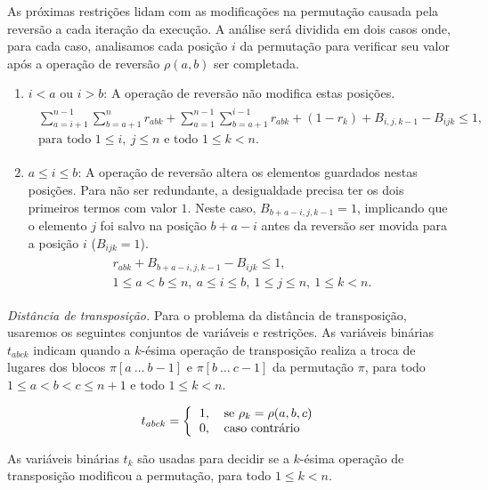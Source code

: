 As próximas restrições lidam com as modificações na permutação causada
pela reversão a cada iteração da execução. A análise será dividida em
dois casos onde, para cada caso, analisamos cada posição $i$ da
permutação para verificar seu valor após a operação de reversão
$\rho(a,b)$ ser completada.
\begin{enumerate}
\item{$i < a$ ou $i > b$:
A operação de reversão não modifica estas posições.
\begin{align}
  \begin{split}
    \sum_{a=i+1}^{n-1}\sum_{b=a+1}^{n} r_{abk} +
    \sum_{a=1}^{n-1}\sum_{b=a+1}^{i-1} r_{abk} +
    (1 - r_{k}) + B_{i,j,k-1} - B_{ijk} \le 1, \\
    \text{para todo $1 \le i,~j \le n$ e todo $1 \le k < n$}.
  \end{split}
  \label{eq:rev3}
\end{align}}
\item{$a \le i \le b$:
A operação de reversão altera os elementos guardados nestas
posições. Para não ser redundante, a desigualdade precisa ter os dois
primeiros termos com valor $1$. Neste caso, $B_{b+a-i,j,k-1} = 1$,
implicando que o elemento $j$ foi salvo na posição $b + a - i$ antes
da reversão ser movida para a posição $i$ ($B_{ijk} = 1$).
\begin{align}
  \begin{split}
  r_{abk} + B_{b+a-i,j,k-1} - B_{ijk} \le 1, \\
  \text{$1 \le a < b \le n,~a \le i \le b,~1 \le j
    \le n,~1 \le k < n$}.
  \end{split}
  \label{eq:rev4}
\end{align}}
\end{enumerate}

\textit{Distância de transposição.}
Para o problema da distância de transposição, usaremos os seguintes
conjuntos de variáveis e restrições. As variáveis binárias $t_{abck}$
indicam quando a $k$-ésima operação de transposição realiza a troca de
lugares dos blocos $\pi[a~\ldots~b - 1]$ e $\pi[b~\ldots~c - 1]$ da
permutação $\pi$, para todo $1 \le a < b < c \le n + 1$ e todo $ 1 \le
k < n$.

\[ 
  t_{abck} = \left \{ 
  \begin{tabular}{ll} 
  1, & se $\rho_{k} = \rho(a,b,c)$ \\ 
  0, & caso contrário 
  \end{tabular} \right .
\] 

As variáveis binárias $t_{k}$ são usadas para decidir se a $k$-ésima
operação de transposição modificou a permutação, para todo $ 1 \le k <
n$.

